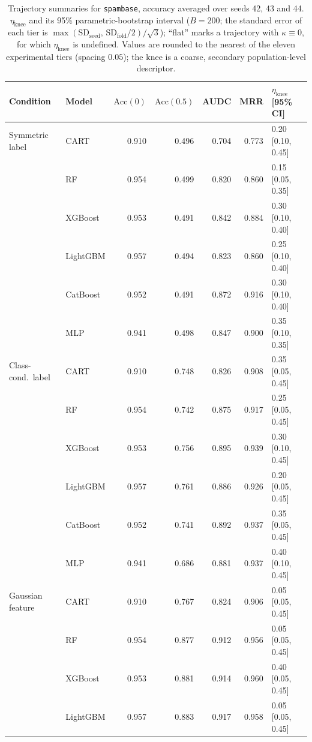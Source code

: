 \begin{table}[p]
\centering
\scriptsize
\setlength{\tabcolsep}{3.5pt}
\caption{Trajectory summaries for \texttt{spambase}, accuracy averaged over seeds 42, 43 and 44. $\eta_{\mathrm{knee}}$ and its 95\% parametric-bootstrap interval ($B=200$; the standard error of each tier is $\max(\mathrm{SD}_{\mathrm{seed}},\,\mathrm{SD}_{\mathrm{fold}}/2)/\sqrt3$); ``flat'' marks a trajectory with $\kappa\equiv 0$, for which $\eta_{\mathrm{knee}}$ is undefined. Values are rounded to the nearest of the eleven experimental tiers (spacing $0.05$); the knee is a coarse, secondary population-level descriptor.}
\label{tab:traj_spambase}
\begin{tabular}{@{}llrrrrl@{}}
\toprule
Condition & Model & $\mathrm{Acc}(0)$ & $\mathrm{Acc}(0.5)$ & AUDC & MRR & $\eta_{\mathrm{knee}}$ [95\% CI] \\
\midrule
Symmetric label & CART & 0.910 & 0.496 & 0.704 & 0.773 & 0.20 [0.10, 0.45] \\
 & RF & 0.954 & 0.499 & 0.820 & 0.860 & 0.15 [0.05, 0.35] \\
 & XGBoost & 0.953 & 0.491 & 0.842 & 0.884 & 0.30 [0.10, 0.40] \\
 & LightGBM & 0.957 & 0.494 & 0.823 & 0.860 & 0.25 [0.10, 0.40] \\
 & CatBoost & 0.952 & 0.491 & 0.872 & 0.916 & 0.30 [0.10, 0.40] \\
 & MLP & 0.941 & 0.498 & 0.847 & 0.900 & 0.35 [0.10, 0.35] \\
\midrule
Class-cond.\ label & CART & 0.910 & 0.748 & 0.826 & 0.908 & 0.35 [0.05, 0.45] \\
 & RF & 0.954 & 0.742 & 0.875 & 0.917 & 0.25 [0.05, 0.45] \\
 & XGBoost & 0.953 & 0.756 & 0.895 & 0.939 & 0.30 [0.10, 0.45] \\
 & LightGBM & 0.957 & 0.761 & 0.886 & 0.926 & 0.20 [0.05, 0.45] \\
 & CatBoost & 0.952 & 0.741 & 0.892 & 0.937 & 0.35 [0.05, 0.45] \\
 & MLP & 0.941 & 0.686 & 0.881 & 0.937 & 0.40 [0.10, 0.45] \\
\midrule
Gaussian feature & CART & 0.910 & 0.767 & 0.824 & 0.906 & 0.05 [0.05, 0.45] \\
 & RF & 0.954 & 0.877 & 0.912 & 0.956 & 0.05 [0.05, 0.45] \\
 & XGBoost & 0.953 & 0.881 & 0.914 & 0.960 & 0.40 [0.05, 0.45] \\
 & LightGBM & 0.957 & 0.883 & 0.917 & 0.958 & 0.05 [0.05, 0.45] \\

\end{tabular}
\end{table}
